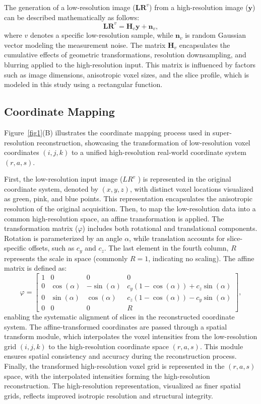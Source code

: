 \documentclass[AMA,STIX2COL]{MRM}
\begin{document}
The generation of a low-resolution image ($\mathbf{LR}^v$) from a high-resolution image ($\mathbf{y}$) can be described mathematically as follows: 
%
\begin{equation}
\label{eq2}
\mathbf{LR}^v=\mathbf{H}_v \mathbf{y}+\mathbf{n}_v,
\end{equation}
%
where $v$ denotes a specific low-resolution sample, while $\mathbf{n}_v$ is random Gaussian vector modeling the measurement noise. The matrix $\mathbf{H}_v$ encapsulates the cumulative effects of geometric transformations, resolution downsampling, and blurring applied to the high-resolution input. This matrix is influenced by factors such as image dimensions, anisotropic voxel sizes, and the slice profile, which is modeled in this study using a rectangular function.
%
\subsection{Coordinate Mapping}
Figure~\ref{fig1}(B) illustrates the coordinate mapping process used in super-resolution reconstruction, showcasing the transformation of low-resolution voxel coordinates $(i,j,k)$ to a unified high-resolution real-world coordinate system $(r,a,s)$.

First, the low-resolution input image ($LR^v$ ) is represented in the original coordinate system, denoted by $(x,y,z)$, with distinct voxel locations visualized as green, pink, and blue points. This representation encapsulates the anisotropic resolution of the original acquisition. 
%
Then, to map the low-resolution data into a common high-resolution space, an affine transformation is applied. The transformation matrix ($\varphi$) includes both rotational and translational components. Rotation is parameterized by an angle $\alpha$, while translation accounts for slice-specific offsets, such as $c_y$ and 
$c_z$. The last element in the fourth column, $R$ represents the scale in space (commonly $R=1$, indicating no scaling).
%
The affine matrix is defined as:
\begin{equation}
\varphi=\left[\begin{array}{cccc}
1 & 0 & 0 & 0 \\
0 & \cos (\alpha) & -\sin (\alpha) & c_y(1-\cos (\alpha))+c_z \sin (\alpha) \\
0 & \sin (\alpha) & \cos (\alpha) & c_z(1-\cos (\alpha))-c_y \sin (\alpha)\\
0 & 0 & 0 & R
\end{array}\right],
\label{eq3}
\end{equation}
%
enabling the systematic alignment of slices in the reconstructed coordinate system. The affine-transformed coordinates are passed through a spatial transform module, which interpolates the voxel intensities from the low-resolution grid $(i,j,k)$ to the high-resolution coordinate space $(r,a,s)$. This module ensures spatial consistency and accuracy during the reconstruction process.
%
Finally, the transformed high-resolution voxel grid is represented in the $(r,a,s)$ space, with the interpolated intensities forming the high-resolution reconstruction. The high-resolution representation, visualized as finer spatial grids, reflects improved isotropic resolution and structural integrity.
\end{document}
